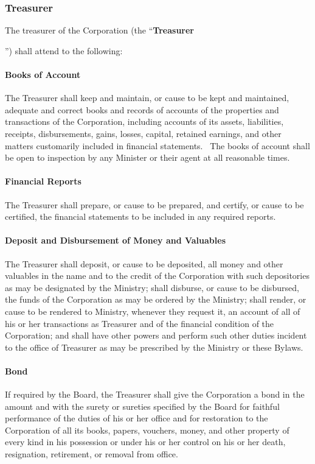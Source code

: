 \documentclass[letterpaper,titlepage]{article}
\newcommand{\defn}[1]{\refstepcounter{defn}\textbf{#1}\addcontentsline{defn}{defn}{\protect\numberline{\thedefn}#1}}
\begin{document}
\subsubsection{Treasurer}
\label{sec:treasurer}
The treasurer of the Corporation (the ``\defn{Treasurer}'') shall attend to the following:
\paragraph{Books of Account}
The Treasurer shall keep and maintain, or cause to be kept and maintained, adequate and correct books and records of accounts of the properties and transactions of the Corporation, including accounts of its assets, liabilities, receipts, disbursements, gains, losses, capital, retained earnings, and other matters customarily included in financial statements.  The books of account shall be open to inspection by any Minister or their agent at all reasonable times.
\paragraph{Financial Reports}
The Treasurer shall prepare, or cause to be prepared, and certify, or cause to be certified, the financial statements to be included in any required reports.
\paragraph{Deposit and Disbursement of Money and Valuables}
The Treasurer shall deposit, or cause to be deposited, all money and other valuables in the name and to the credit of the Corporation with such depositories as may be designated by the Ministry; shall disburse, or cause to be disbursed, the funds of the Corporation as may be ordered by the Ministry; shall render, or cause to be rendered to Ministry, whenever they request it, an account of all of his or her transactions as Treasurer and of the financial condition of the Corporation; and shall have other powers and perform such other duties incident to the office of Treasurer as may be prescribed by the Ministry or these Bylaws.
\paragraph{Bond}
If required by the Board, the Treasurer shall give the Corporation a bond in the amount and with the surety or sureties specified by the Board for faithful performance of the duties of his or her office and for restoration to the Corporation of all its books, papers, vouchers, money, and other property of every kind in his possession or under his or her control on his or her death, resignation, retirement, or removal from office.
\end{document}
